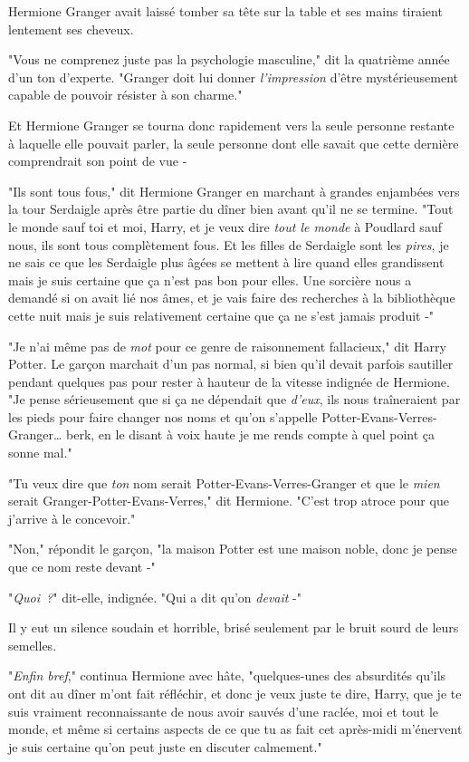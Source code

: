 Hermione Granger avait laissé tomber sa tête sur la table et ses mains tiraient lentement ses cheveux.

"Vous ne comprenez juste pas la psychologie masculine," dit la quatrième année d'un ton d'experte. "Granger doit lui donner \emph{l'impression} d'être mystérieusement capable de pouvoir résister à son charme."


Et Hermione Granger se tourna donc rapidement vers la seule personne restante à laquelle elle pouvait parler, la seule personne dont elle savait que cette dernière comprendrait son point de vue -

"Ils sont tous fous," dit Hermione Granger en marchant à grandes enjambées vers la tour Serdaigle après être partie du dîner bien avant qu'il ne se termine. "Tout le monde sauf toi et moi, Harry, et je veux dire \emph{tout le monde} à Poudlard sauf nous, ils sont tous complètement fous. Et les filles de Serdaigle sont les \emph{pires}, je ne sais ce que les Serdaigle plus âgées se mettent à lire quand elles grandissent mais je suis certaine que ça n'est pas bon pour elles. Une sorcière nous a demandé si on avait lié nos âmes, et je vais faire des recherches à la bibliothèque cette nuit mais je suis relativement certaine que ça ne s'est jamais produit -"

"Je n'ai même pas de \emph{mot} pour ce genre de raisonnement fallacieux," dit Harry Potter. Le garçon marchait d'un pas normal, si bien qu'il devait parfois sautiller pendant quelques pas pour rester à hauteur de la vitesse indignée de Hermione. "Je pense sérieusement que si ça ne dépendait que \emph{d'eux}, ils nous traîneraient par les pieds pour faire changer nos noms et qu'on s'appelle Potter-Evans-Verres-Granger… berk, en le disant à voix haute je me rends compte à quel point ça sonne mal."

"Tu veux dire que \emph{ton} nom serait Potter-Evans-Verres-Granger et que le \emph{mien} serait Granger-Potter-Evans-Verres," dit Hermione. "C'est trop atroce pour que j'arrive à le concevoir."

"Non," répondit le garçon, "la maison Potter est une maison noble, donc je pense que ce nom reste devant -"

"\emph{Quoi~?}" dit-elle, indignée. "Qui a dit qu'on \emph{devait} -"

Il y eut un silence soudain et horrible, brisé seulement par le bruit sourd de leurs semelles.

"\emph{Enfin bref}," continua Hermione avec hâte, "quelques-unes des absurdités qu'ils ont dit au dîner m'ont fait réfléchir, et donc je veux juste te dire, Harry, que je te suis vraiment reconnaissante de nous avoir sauvés d'une raclée, moi et tout le monde, et même si certains aspects de ce que tu as fait cet après-midi m'énervent je suis certaine qu'on peut juste en discuter calmement."

